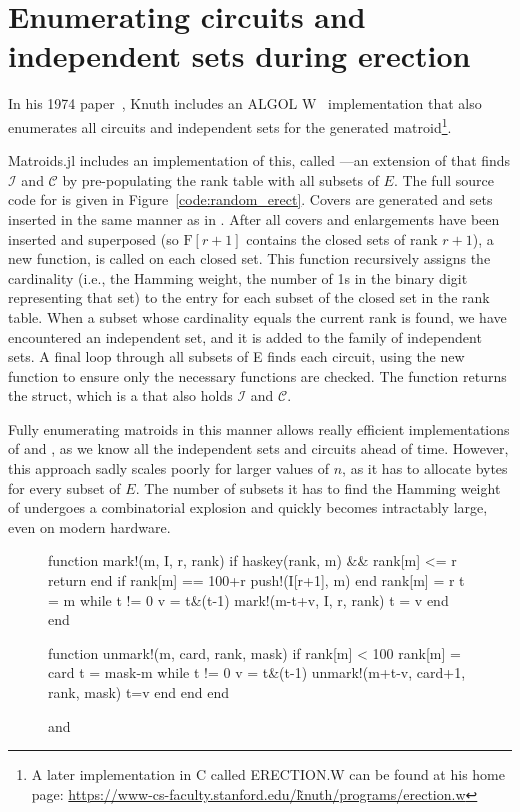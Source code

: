 \chapter{Enumerating circuits and independent sets during erection}
\label{apx:full-erection}
In his 1974 paper~\cite{knuth-1975}, Knuth includes an ALGOL W~\cite{wirth-1966} implementation that also enumerates all circuits and independent sets for the generated matroid\footnote{A later implementation in C called ERECTION.W can be found at his home page: \href{https://www-cs-faculty.stanford.edu/\~knuth/programs/erection.w}{https://www-cs-faculty.stanford.edu/\~knuth/programs/erection.w}}. 

Matroids.jl includes an implementation of this, called ---an extension of  that finds $\mathcal{I}$ and $\mathcal{C}$ by pre-populating the rank table with all subsets of $E$. The full source code for  is given in Figure~\ref{code:random_erect}. Covers are generated and sets inserted in the same manner as in . After all covers and enlargements have been inserted and superposed (so $\mathrm{F}[r+1]$ contains the closed sets of rank $r+1$), a new function,  is called on each closed set. This function recursively assigns the cardinality (i.e., the Hamming weight, the number of 1s in the binary digit representing that set) to the entry for each subset of the closed set in the rank table. When a subset whose cardinality equals the current rank is found, we have encountered an independent set, and it is added to the family of independent sets. A final loop through all subsets of E finds each circuit, using the new  function to ensure only the necessary functions are checked. The function returns the  struct, which is a  that also holds $\mathcal{I}$ and $\mathcal{C}$.

Fully enumerating matroids in this manner allows really efficient implementations of  and , as we know all the independent sets and circuits ahead of time. However, this approach sadly scales poorly for larger values of $n$, as it has to allocate bytes for every subset of $E$. The number of subsets it has to find the Hamming weight of undergoes a combinatorial explosion and quickly becomes intractably large, even on modern hardware.

\begin{figure}
  \begin{jllisting}
function mark!(m, I, r, rank)
  if haskey(rank, m) && rank[m] <= r
    return
  end
  if rank[m] == 100+r push!(I[r+1], m) end
  rank[m] = r
  t = m
  while t != 0
    v = t&(t-1)
    mark!(m-t+v, I, r, rank)
    t = v
  end
end

function unmark!(m, card, rank, mask)
  if rank[m] < 100
    rank[m] = card
    t = mask-m
    while t != 0
      v = t&(t-1)
      unmark!(m+t-v, card+1, rank, mask)
      t=v
    end
  end
end
  \end{jllisting}
  \caption{ and }
\end{figure}

